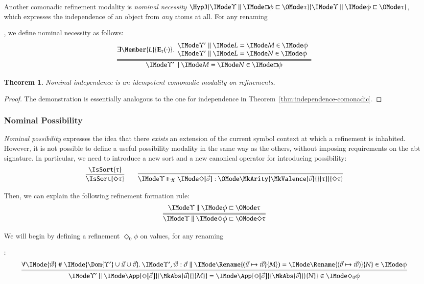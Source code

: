 \documentclass[11pt]{article}
\newtheorem{thm}{Theorem}[section]
\theoremstyle{definition}
\theoremstyle{notation}
\theoremstyle{remark}
\numberwithin{equation}{section}
\newcommand\Exprs{\mathbf{E}}
\begin{document}
Another comonadic refinement modality is \emph{nominal necessity}
$\HypJ{\Refines{\Upsilon}{\Box\phi}{\tau}}{\Refines{\Upsilon}{\phi}{\tau}}$,
which expresses the independence of an object from \emph{any} atoms at all. For
any renaming
%
, we define nominal necessity as follows:
\[
  \infer={
    \RMemEq{\Upsilon'}{M}{N}{\Box\phi}
  }{
    \exists\Member{L}{\Exprs_\tau(\cdot)}.
    \begin{array}{l}
      \RMemEq{\Upsilon'}{L}{M}{\phi}\\
      \RMemEq{\Upsilon'}{L}{N}{\phi}
    \end{array}
  }
\]

\begin{thm}
  Nominal independence is an idempotent comonadic modality on refinements.
\end{thm}
\begin{proof}
  The demonstration is essentially analogous to the one for independence in
  Theorem~\ref{thm:independence-comonadic}.
\end{proof}

\subsubsection{Nominal Possibility}

\emph{Nominal possibility} expresses the idea that there \emph{exists} an
extension of the current symbol context at which a refinement is inhabited.
However, it is not possible to define a useful possibility modality in the same
way as the others, without imposing requirements on the abt signature. In
particular, we need to introduce a new sort and a new canonical operator for
introducing possibility:
\[
  \infer{
    \IsSort{\Diamond\tau}
  }{
    \IsSort{\tau}
  }\qquad
  \infer{
    \IsCanOperator{\Upsilon}{\Diamond[\vec{\sigma}]}{
      \MkArity{
        \MkValence{\vec{\sigma}}{}{\tau}
      }{\Diamond\tau}
    }
  }{
  }
\]

Then, we can explain the following refinement formation rule:
\[
  \infer={
    \Refines{\Upsilon}{\Diamond\phi}{\Diamond\tau}
  }{
    \Refines{\Upsilon}{\phi}{\tau}
  }
\]

We will begin by defining a refinement $\Diamond_0\phi$ on values, for any renaming
%
:
\[
  \infer={
    \RMemEq{\Upsilon'}{
      \App{
        \Diamond[\vec{\sigma}]
      }{
        \MkAbs{\vec{u}}{}{M}
      }
    }{
      \App{
        \Diamond[\vec{\sigma}]
      }{
        \MkAbs{\vec{v}}{}{N}
      }
    }{\Diamond_0\phi}
  }{
    \forall\IMode{\vec{w}}\mathrel{\#}\IMode{\Dom{\Upsilon'}\cup\vec{u}\cup\vec{v}}.\
    \RMemEq{\Upsilon',\vec{w}:\vec{\sigma}}{\Rename{(\vec{u}\mapsto\vec{w}}{M})}{\Rename{(\vec{v}\mapsto\vec{w})}{N}}{\phi}
  }
\]
\end{document}
